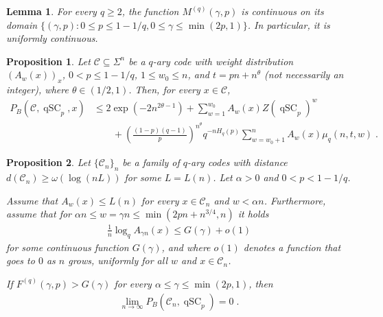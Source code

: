 \documentclass[10pt,a4paper]{amsart}
\newtheorem{lemma}{Lemma}
\newtheorem{proposition}{Proposition}
\newcommand{\cC}{\mathcal{C}}
\DeclareMathOperator{\qSC}{qSC}
\begin{document}
\begin{lemma}
\label{lem:M_q_continuity}
For every $q\ge 2$, the function $M^{(q)}(\gamma,p)$ is continuous on its domain $\{(\gamma,p): 0\le p\le1-1/q, 0\le \gamma\le\min(2p,1)\}$.
In particular, it is uniformly continuous.
\end{lemma}

\begin{proposition}
\label{prop:poltyrev}
    Let $\cC\subseteq\Sigma^n$ be a $q$-ary
    code with weight
    distribution $(A_w(x))_x$,
    $0<p\le 1-1/q$, $1\le w_0\le n$,
    and $t=p n+n^{\theta}$
    (not necessarily an integer), where $\theta\in(1/2,1)$. Then, 
    for every $x\in\cC$,
    \begin{align}
    \label{eq:22}
        P_{B}(\cC,\qSC_p, x)&\le 2\exp\left(-2n^{2\theta-1}\right)+\sum_{w=1}^{w_0}A_w(x)Z(\qSC_p)^w\\
        &\qquad+\left(\frac{(1-p)(q-1)}{p}\right)^{n^\theta}q^{-nH_q(p)}\sum_{w=w_0+1}^{n}A_w(x)\mu_q(n,t,w)\;.
    \label{eq:23}
    \end{align}
\end{proposition}

\begin{proposition}
\label{prop:qsc-vanishing-pb}
Let $\{\cC_n\}_n$ be a family of $q$-ary codes
with distance $d(\cC_n)\ge\omega(\log(nL))$
for some $L=L(n)$.
Let $\alpha>0$ and $0<p<1-1/q$.

Assume that $A_w(x)\le L(n)$ for every $x\in\cC_n$ and
$w<\alpha n$. Furthermore, assume that
for $\alpha n\le w=\gamma n\le \min(2pn+n^{3/4}, n)$ it holds
\begin{align}
\label{eq:24}
\frac{1}{n}\log_q A_{\gamma n}(x)\le G(\gamma)+o(1)
\end{align}
for some continuous function $G(\gamma)$,
and where $o(1)$ denotes a function that goes to $0$ as
$n$ grows, uniformly for all $w$ and $x\in\cC_n$.

If $F^{(q)}(\gamma, p)>G(\gamma)$ for every
$\alpha\le \gamma\le \min(2p, 1)$, then
\begin{align*}
\lim_{n\to\infty} P_B(\cC_n, \qSC_p)=0\;.
\end{align*}
\end{proposition}
\end{document}
